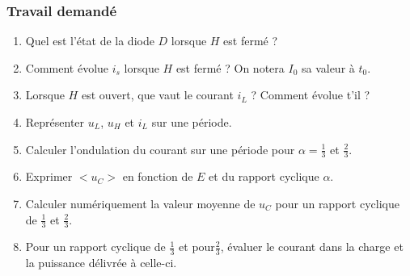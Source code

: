 \subsubsection{Travail demandé}
\begin{enumerate}
\item Quel est l’état de la diode $D$ lorsque $H$ est fermé ? 
\item Comment évolue $i_s$ lorsque $H$ est fermé ? On notera $I_0$ sa valeur à $t_0$. 
\item Lorsque $H$ est ouvert, que vaut le courant $i_L$ ? Comment évolue t’il ? 
\item Représenter $u_L$, $u_H$ et $i_L$ sur une période. 
\item Calculer l’ondulation du courant sur une période pour $\alpha=\frac{1}{3}$ et $\frac{2}{3}$. 
\item Exprimer $<u_C>$  en fonction de $E$ et du rapport cyclique $\alpha$. 
\item Calculer numériquement la valeur moyenne de $u_C$ pour un rapport cyclique de $\frac{1}{3}$ et $\frac{2}{3}$.
\item Pour un rapport cyclique de $\frac{1}{3}$ et pour$\frac{2}{3}$, évaluer le courant dans la charge et la puissance délivrée à celle-ci. 
\end{enumerate}


\newpage

